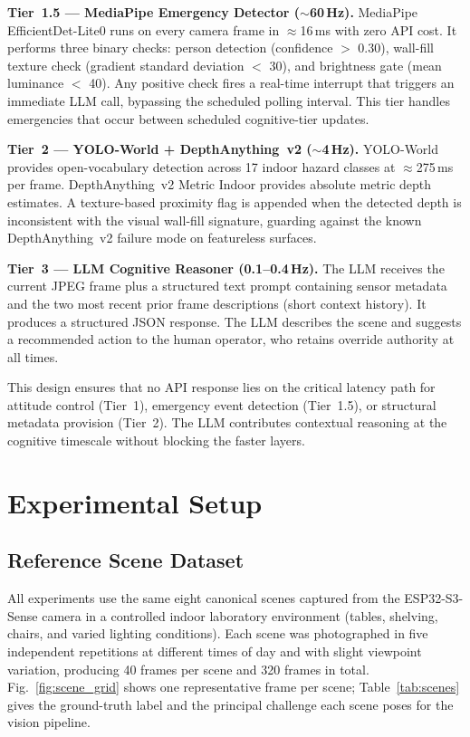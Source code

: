 \documentclass[journal]{IEEEtran}
\begin{document}
\textbf{Tier~1.5 --- MediaPipe Emergency Detector ($\sim$60\,Hz).}
MediaPipe EfficientDet-Lite0 runs on every camera frame in $\approx$16\,ms
with zero API cost.
It performs three binary checks: person detection (confidence $>$ 0.30),
wall-fill texture check (gradient standard deviation $<$ 30), and
brightness gate (mean luminance $<$ 40).
Any positive check fires a real-time interrupt that triggers an immediate
LLM call, bypassing the scheduled polling interval.
This tier handles emergencies that occur between scheduled cognitive-tier
updates.

\textbf{Tier~2 --- YOLO-World + DepthAnything~v2 ($\sim$4\,Hz).}
YOLO-World provides open-vocabulary detection across 17 indoor hazard
classes at $\approx$275\,ms per frame.
DepthAnything~v2 Metric Indoor provides absolute metric depth estimates.
A texture-based proximity flag is appended when the detected depth is
inconsistent with the visual wall-fill signature, guarding against the
known DepthAnything~v2 failure mode on featureless surfaces.

\textbf{Tier~3 --- LLM Cognitive Reasoner (0.1--0.4\,Hz).}
The LLM receives the current JPEG frame plus a structured text prompt
containing sensor metadata and the two most recent prior frame
descriptions (short context history).
It produces a structured JSON response.
The LLM describes the scene and suggests a recommended action to
the human operator, who retains override authority at all times.

This design ensures that no API response lies on the critical latency
path for attitude control (Tier~1), emergency event detection
(Tier~1.5), or structural metadata provision (Tier~2).
The LLM contributes contextual reasoning at the cognitive timescale
without blocking the faster layers.


\section{Experimental Setup}
\label{sec:setup}

\subsection{Reference Scene Dataset}

All experiments use the same eight canonical scenes captured from the
ESP32-S3-Sense camera in a controlled indoor laboratory environment
(tables, shelving, chairs, and varied lighting conditions).
Each scene was photographed in five independent repetitions at
different times of day and with slight viewpoint variation, producing
40 frames per scene and 320 frames in total.
Fig.~\ref{fig:scene_grid} shows one representative frame per scene;
Table~\ref{tab:scenes} gives the ground-truth label and the principal
challenge each scene poses for the vision pipeline.
\end{document}
